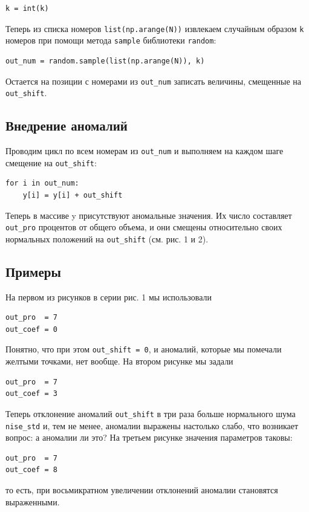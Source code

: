 \documentclass[a4paper,12pt]{article}
\begin{document}
\begin{verbatim}
k = int(k)
\end{verbatim}
Теперь из списка номеров \texttt{list(np.arange(N))} извлекаем случайным образом \texttt{k} номеров при помощи метода \texttt{sample} библиотеки \texttt{random}:

\begin{verbatim}
out_num = random.sample(list(np.arange(N)), k)
\end{verbatim}
Остается на позиции с номерами из \texttt{out\_num} записать величины, смещенные на \texttt{out\_shift}.


\subsection{Внедрение аномалий}

Проводим цикл по всем номерам из \texttt{out\_num} и выполняем на каждом шаге смещение на \texttt{out\_shift}:

\begin{verbatim}
for i in out_num: 
    y[i] = y[i] + out_shift
\end{verbatim}
Теперь в массиве y присутствуют аномальные значения. Их число составляет \texttt{out\_pro} процентов от общего объема, и они смещены относительно своих нормальных положений на  \texttt{out\_shift} (см. рис. 1 и 2).

\subsection{Примеры}

На первом из рисунков в серии рис. 1 мы использовали
\begin{verbatim}
out_pro  = 7
out_coef = 0
\end{verbatim}
Понятно, что при этом \texttt{out\_shift = 0}, и аномалий, которые мы помечали желтыми точками, нет вообще. На втором рисунке мы задали
\begin{verbatim}
out_pro  = 7
out_coef = 3
\end{verbatim}
Теперь отклонение аномалий \texttt{out\_shift} в три раза больше нормального шума \texttt{nise\_std} и, тем не менее, аномалии выражены настолько слабо, что возникает вопрос: а аномалии ли это? На третьем рисунке значения параметров таковы:
\begin{verbatim}
out_pro  = 7
out_coef = 8
\end{verbatim}
то есть, при восьмикратном увеличении отклонений аномалии становятся выраженными.
\end{document}
